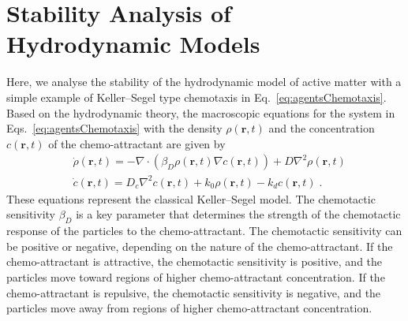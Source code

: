 \documentclass[a4paper, amsfonts, amssymb, amsmath, reprint, showkeys, showpacs, nofootinbib, twoside]{revtex4-2}
\begin{document}
\section{\label{sec:stabilityAnalysis} Stability Analysis of Hydrodynamic Models}
Here, we analyse the stability of the hydrodynamic model of active matter with a simple example of Keller--Segel type chemotaxis in Eq.~\eqref{eq:agentsChemotaxis}. 
Based on the hydrodynamic theory, the macroscopic equations for the system in Eqs.~\eqref{eq:agentsChemotaxis} with the density $\rho (\mathbf{r},t)$ and the concentration $c(\mathbf{r},t)$ of the chemo-attractant are given by
\begin{subequations}
    \label{eq:hydroChemotaxis}
    \begin{align}
        &\dot{\rho}\left( \mathbf{r},t \right) =-\nabla \cdot \left( \beta _D\rho \left( \mathbf{r},t \right) \nabla c\left( \mathbf{r},t \right) \right) +D\nabla ^2\rho \left( \mathbf{r},t \right)\\
        &\dot{c}\left( \mathbf{r},t \right) =D_c\nabla ^2c\left( \mathbf{r},t \right) +k_0\rho \left( \mathbf{r},t \right) -k_dc\left( \mathbf{r},t \right)\;.
    \end{align}
\end{subequations}
These equations represent the classical Keller--Segel model. The chemotactic sensitivity $\beta _D$ is a key parameter that determines the strength of the chemotactic response of the particles to the chemo-attractant. The chemotactic sensitivity can be positive or negative, depending on the nature of the chemo-attractant. If the chemo-attractant is attractive, the chemotactic sensitivity is positive, and the particles move toward regions of higher chemo-attractant concentration. If the chemo-attractant is repulsive, the chemotactic sensitivity is negative, and the particles move away from regions of higher chemo-attractant concentration.
\end{document}
